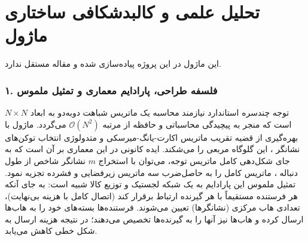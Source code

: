 \section{تحلیل علمی و کالبدشکافی ساختاری ماژول }

این ماژول در این پروژه پیاده‌سازی شده و مقاله مستقل ندارد.
\label{sec:nystrom_attention}

\subsubsection*{۱. فلسفه طراحی، پارادایم معماری و تمثیل ملموس}
توجه چندسره استاندارد نیازمند محاسبه یک ماتریس شباهت دو‌به‌دو به ابعاد $N \times N$ است که منجر به پیچیدگی محاسباتی و حافظه از مرتبه $\mathcal{O}(N^2)$ می‌گردد. ماژول  با بهره‌گیری از قضیه تقریب ماتریس اکارت-یانگ-میرسکی  و متدولوژی انتخاب توکن‌های نشانگر ، این گلوگاه مربعی را می‌شکند. ایده کانونی در این معماری بر آن است که به جای شکل‌دهی کامل ماتریس توجه، می‌توان با استخراج $m$ نشانگر شاخص از طول دنباله ، ماتریس کامل را به حاصل‌ضرب سه ماتریس زیرفضایی و فشرده تجزیه نمود. 
تمثیل ملموس این پارادایم به یک شبکه لجستیک و توزیع کالا شبیه است: به جای آنکه هر فرستنده مستقیماً با هر گیرنده ارتباط برقرار کند (اتصال کامل با هزینه بی‌نهایت)، تعدادی هاب مرکزی (نشانگرها) تعیین می‌شوند. فرستنده‌ها بسته‌های خود را به هاب‌ها ارسال کرده و هاب‌ها نیز آنها را به گیرنده‌ها تخصیص می‌دهند؛ در نتیجه هزینه ارسال به شکل خطی کاهش می‌یابد.


